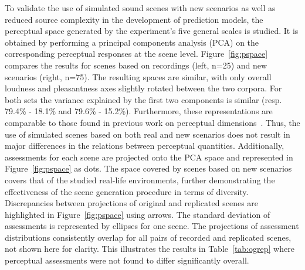 \documentclass[11pt,a4paper]{article}
\begin{document}
To validate the use of simulated sound scenes with new scenarios as well as reduced source complexity in the development of prediction models, the perceptual space generated by the experiment's five general scales is studied. It is obtained by performing a principal components analysis (PCA) on the corresponding perceptual responses at the scene level. Figure~\ref{fig:pspace} compares the results for scenes based on recordings (left, n=25) and new scenarios (right, n=75). The resulting spaces are similar, with only overall loudness and pleasantness axes slightly rotated between the two corpora. For both sets the variance explained by the first two components is similar (resp. 79.4\% - 18.1\% and 79.6\% - 15.2\%). Furthermore, these representations are comparable to those found in previous work on perceptual dimensions~\cite{axelsson2010, cain2013}. Thus, the use of simulated scenes based on both real and new scenarios does not result in major differences in the relations between perceptual quantities. Additionally, assessments for each scene are projected onto the PCA space and represented in Figure~\ref{fig:pspace} as dots. The space covered by scenes based on new scenarios covers that of the studied real-life environments, further demonstrating the effectiveness of the scene generation procedure in terms of diversity.\\

Discrepancies between projections of original and replicated scenes are highlighted in Figure~\ref{fig:pspace} using arrows. The standard deviation of assessments is represented by ellipses for one scene. The projections of assessment distributions consistently overlap for all pairs of recorded and replicated scenes, not shown here for clarity. This illustrates the results in Table~\ref{tab:ogrep} where perceptual assessments were not found to differ significantly overall.\\
\end{document}
